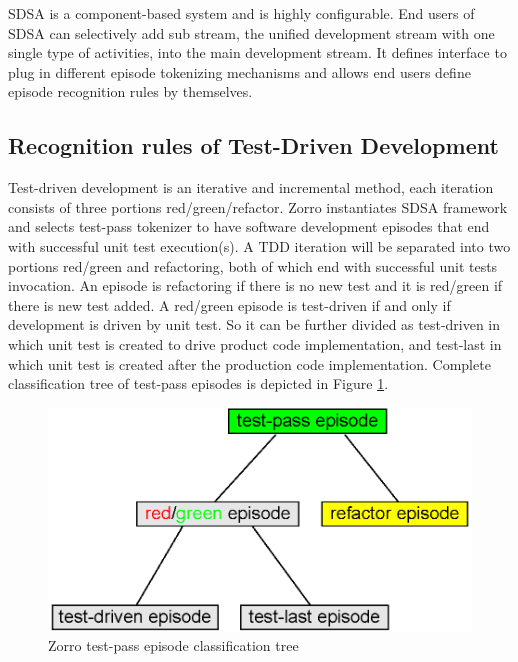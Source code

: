SDSA is a component-based system and is highly configurable. End users of
SDSA can selectively add sub stream, the unified development stream with
one single type of activities, into the main development stream. It defines
interface to plug in different episode tokenizing mechanisms and allows end
users define episode recognition rules by themselves.

\subsection{Recognition rules of Test-Driven Development}
Test-driven development is an iterative and incremental method, each
iteration consists of three portions red/green/refactor. Zorro instantiates
SDSA framework and selects test-pass tokenizer to have software development
episodes that end with successful unit test execution(s). A TDD iteration
will be separated into two portions red/green and refactoring, both of
which end with successful unit tests invocation. An episode is refactoring
if there is no new test and it is red/green if there is new test added. A
red/green episode is test-driven if and only if development is driven by
unit test.  So it can be further divided as test-driven in which unit test
is created to drive product code implementation, and test-last in which
unit test is created after the production code implementation. Complete
classification tree of test-pass episodes is depicted in Figure
\ref{fig:EpisodeTree}.
\begin{figure}[htbp] 
  \centering
  \includegraphics{figs/EpisodeClassficationTree.eps}
  \caption{Zorro test-pass episode classification tree}\label{fig:EpisodeTree}
\end{figure} 


